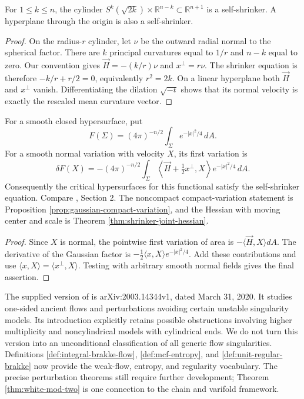 \begin{proposition}\label{prop:shrinking-cylinders}
For $1\leq k\leq n$, the cylinder $S^k(\sqrt{2k})\times\mathbb R^{n-k}\subset\mathbb R^{n+1}$ is a self-shrinker. A hyperplane through the origin is also a self-shrinker.
\end{proposition}
\begin{proof}
On the radius-$r$ cylinder, let $\nu$ be the outward radial normal to the spherical factor. There are $k$ principal curvatures equal to $1/r$ and $n-k$ equal to zero. Our convention gives $\vec H=-(k/r)\nu$ and $x^\perp=r\nu$. The shrinker equation is therefore $-k/r+r/2=0$, equivalently $r^2=2k$. On a linear hyperplane both $\vec H$ and $x^\perp$ vanish. Differentiating the dilation $\sqrt{-t}$ shows that its normal velocity is exactly the rescaled mean curvature vector.
\end{proof}

\begin{proposition}\label{prop:gaussian-first-variation}
For a smooth closed hypersurface, put
\[
 F(\Sigma)=(4\pi)^{-n/2}\int_\Sigma e^{-|x|^2/4}\,dA.
\]
For a smooth normal variation with velocity $X$, its first variation is
\[
 \delta F(X)=-(4\pi)^{-n/2}\int_\Sigma
 \left\langle\vec H+\tfrac12x^\perp,X\right\rangle e^{-|x|^2/4}\,dA.
\]
Consequently the critical hypersurfaces for this functional satisfy the self-shrinker equation. Compare \cite{CCMS20}, Section 2. The noncompact compact-variation statement is Proposition \ref{prop:gaussian-compact-variation}, and the Hessian with moving center and scale is Theorem \ref{thm:shrinker-joint-hessian}.
\end{proposition}
\begin{proof}
Since $X$ is normal, the pointwise first variation of area is $-\langle\vec H,X\rangle dA$. The derivative of the Gaussian factor is $-\tfrac12\langle x,X\rangle e^{-|x|^2/4}$. Add these contributions and use $\langle x,X\rangle=\langle x^\perp,X\rangle$. Testing with arbitrary smooth normal fields gives the final assertion.
\end{proof}

\begin{remark}\label{rem:generic-flow-source}
The supplied version of \cite{CCMS20} is arXiv:2003.14344v1, dated March 31, 2020. It studies one-sided ancient flows and perturbations avoiding certain unstable singularity models. Its introduction explicitly retains possible obstructions involving higher multiplicity and noncylindrical models with cylindrical ends. We do not turn this version into an unconditional classification of all generic flow singularities. Definitions \ref{def:integral-brakke-flow}, \ref{def:mcf-entropy}, and \ref{def:unit-regular-brakke} now provide the weak-flow, entropy, and regularity vocabulary. The precise perturbation theorems still require further development; Theorem \ref{thm:white-mod-two} is one connection to the chain and varifold framework.
\end{remark}
